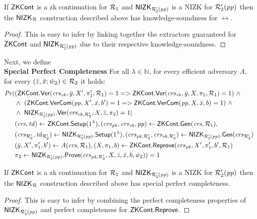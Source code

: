 \begin{lemma} 
\label{le:KS_for_nizkR}
If $\ZKCont$ is a zk continuation for $\relone$ and $\nizktwo$ is a NIZK for $\reltwo'(\pp)$ 
then the $\nizkR$ construction described above has knowledge-soundness for $\rel$. 
\end{lemma} 
\begin{proof}This is easy to infer by linking together the extractors guaranteed for $\ZKCont$ and $\nizktwo$ due to their respective 
knowledge-soundness.
\end{proof}
 
\noindent Next, we define \\ 
\noindent \textbf{Special Perfect Completeness} For all $\lambda \in \mathbb{N}$, for every efficient adversary $A$, for every 
 $(\barz, \barx; \baromega_2) \in \reltwo$ it holds: 
\begin{align*}
\mathit{Pr} (& (\ZKCont.\Verify(\crsvk, \bar{y}, X', \pi'_1, \relone) = 1  = >  \ZKCont.\Verify(\crsvk, \bar{y}, X, \pi_1, \relone) = 1)  \ \wedge \  \\
                   & \wedge \ (\ZKCont.\VerifyCom (\pp, X', \barx, b') = 1 => \ZKCont.\VerifyCom (\pp, X, \barx, b) = 1) \ \wedge \\
                   & \wedge \ \nizktwo.\Verify(\crsvktwo, X, \barz, \pi_2) =1 | \\
                   & (\crs, \tw) \leftarrow \ZKCont.\Setup (1^{\lambda}), (\crspk, \crsvk, \pp) \leftarrow \ZKCont.\Gen(\crs, \relone), \\ 
                   & (\crstwo, \twtwo) \leftarrow \nizktwo.\Setup(1^{\lambda}), (\crspktwo, \crsvktwo) \leftarrow \nizktwo.\Gen(\crstwo) \\
                   & (\bary, X', \pi'_1, b') \leftarrow A(\crs,\relone), (X, \pi_1, b) \leftarrow \ZKCont.\Reprove(\crspk, X', \pi'_1, b', \relone) \\
                   &\pi_2 \leftarrow \nizktwo.\Prove(\crspktwo, X, \barz, \barx, b, \baromega_2)) = 1
\end{align*}

\begin{lemma} 
\label{le:specialCompl_for_nizkR}
If $\ZKCont$ is a zk continuation for $\relone$ and $\nizktwo$ is a NIZK for $\reltwo'(\pp)$ 
then the $\nizkR$ construction described above has special perfect completeness.
\end{lemma} 
\begin{proof} This is easy to infer by combining the perfect completeness properties of $\nizktwo$ and perfect completeness 
for $\ZKCont.\Reprove$.
\end{proof}

